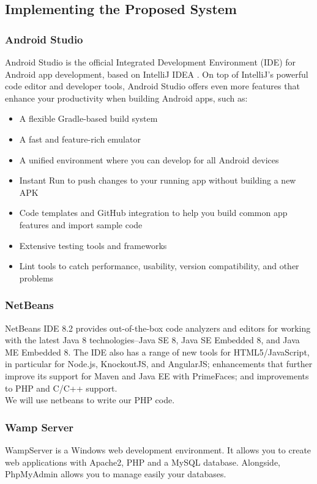 \documentclass[12pt]{article}
\begin{document}
	
	\subsection{Implementing the Proposed System}
		\subsubsection{Android Studio}
		Android Studio is the official Integrated Development Environment (IDE) for Android app development, based on IntelliJ IDEA . On top of IntelliJ's powerful code editor and developer tools, Android Studio offers even more features that enhance your productivity when building Android apps, such as\cite{astudio}:
		\begin{itemize}
			\item A flexible Gradle-based build system
			\item A fast and feature-rich emulator
			\item A unified environment where you can develop for all Android devices
			\item Instant Run to push changes to your running app without building a new APK
			\item Code templates and GitHub integration to help you build common app features and import sample code
			\item Extensive testing tools and frameworks
			\item Lint tools to catch performance, usability, version compatibility, and other problems
		\end{itemize}
		\subsubsection{NetBeans}
		NetBeans IDE 8.2 provides out-of-the-box code analyzers and editors for working with the latest Java 8 technologies--Java SE 8, Java SE Embedded 8, and Java ME Embedded 8. The IDE also has a range of new tools for HTML5/JavaScript, in particular for Node.js, KnockoutJS, and AngularJS; enhancements that further improve its support for Maven and Java EE with PrimeFaces; and improvements to PHP and C/C++ support.\cite{netbeans}  \\
		
		\noindent We will use netbeans to write our PHP code. 
		
		\subsubsection{Wamp Server}
		WampServer is a Windows web development environment. It allows you to create web applications with Apache2, PHP and a MySQL database. Alongside, PhpMyAdmin allows you to manage easily your databases.\\
		
\end{document}
